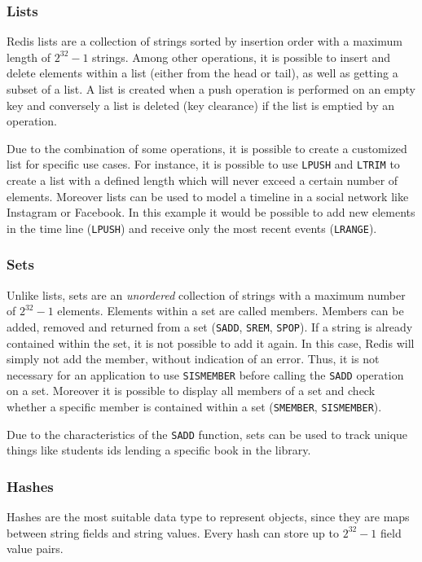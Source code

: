\subsubsection*{Lists}
Redis lists are a collection of strings sorted by insertion order with a maximum
length of $2^{32}-1$ strings. Among other operations, it is possible to insert
and delete elements within a list (either from the head or tail), as well as
getting a subset of a list. A list is created when a push operation is
performed on an empty key and conversely a list is deleted (key clearance) if
the list is emptied by an operation.

Due to the combination of some operations, it is possible to create a customized
list for specific use cases. For instance, it is possible to use \texttt{LPUSH}
and \texttt{LTRIM} to create a list with a defined length which will never
exceed a certain number of elements.  Moreover lists can be used to model a
timeline in a social network like Instagram or Facebook. In this example it
would be possible to add new elements in the time line (\texttt{LPUSH}) and
receive only the most recent events (\texttt{LRANGE}).
\parencite{redis:dataTypesIntroduction, redis:commands, redis:dataTypes}

\subsubsection*{Sets}
Unlike lists, sets are an \textit{unordered} collection of strings with a
maximum number of $2^{32}-1$ elements.
Elements within a set are called members. Members can be added, removed and
returned from a set (\texttt{SADD}, \texttt{SREM}, \texttt{SPOP}). If a string
is already contained within the set, it is not possible to add it again. In this
case, Redis will simply not add the member, without indication of an error.
Thus, it is not necessary for an application to use \texttt{SISMEMBER} before
calling the \texttt{SADD} operation on a set. Moreover it is possible to display
all members of a set and check whether a specific member is contained within a
set (\texttt{SMEMBER}, \texttt{SISMEMBER}).

Due to the characteristics of the \texttt{SADD} function, sets can be used to
track unique things like students ids lending a specific book in the library.
\parencite{redis:dataTypesIntroduction, redis:commands, redis:dataTypes}

\subsubsection*{Hashes}
Hashes are the most suitable data type to represent objects, since they are maps
between string fields and string values. Every hash can store up to
$2^{32}-1$ field value pairs.

